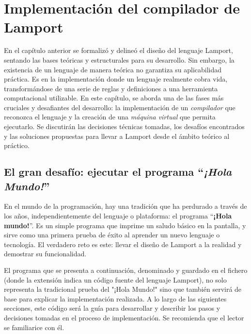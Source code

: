 \chapter{\textbf{Implementación del compilador de Lamport}}

En el capítulo anterior se formalizó y delineó el diseño del lenguaje Lamport, sentando las bases teóricas y estructurales para su desarrollo. Sin embargo, la existencia de un lenguaje de manera teórica no garantiza su aplicabilidad práctica. Es en la implementación donde un lenguaje realmente cobra vida, transformándose de una serie de reglas y definiciones a una herramienta computacional utilizable. En este capítulo, se aborda una de las fases más cruciales y desafiantes del desarrollo: la implementación de un \textit{compilador} que reconozca el lenguaje y la creación de una \textit{máquina virtual} que permita ejecutarlo. Se discutirán las decisiones técnicas tomadas, los desafíos encontrados y las soluciones propuestas para llevar a Lamport desde el ámbito teórico al práctico.

\section{El gran desafío: ejecutar el programa ``\textit{¡Hola Mundo!}''}
En el mundo de la programación, hay una tradición que ha perdurado a través de los años, independientemente del lenguaje o plataforma: el programa ``\textbf{¡Hola mundo!}''. Es un simple programa que imprime un saludo básico en la pantalla, y sirve como una primera prueba de éxito al aprender un nuevo lenguaje o tecnología. El verdadero reto es este: llevar el diseño de Lamport a la realidad y demostrar su funcionalidad.




El programa que se presenta a continuación, denominado  y guardado en el fichero  (donde la extensión  indica un código fuente del lenguaje Lamport), no solo representa la tradicional prueba del "¡Hola Mundo!" sino que también servirá de base para explicar la implementación realizada. A lo largo de las siguientes secciones, este código será la guía para desarrollar y describir los pasos y decisiones tomadas en el proceso de implementación. Se recomienda que el lector se familiarice con él.

\newpage

